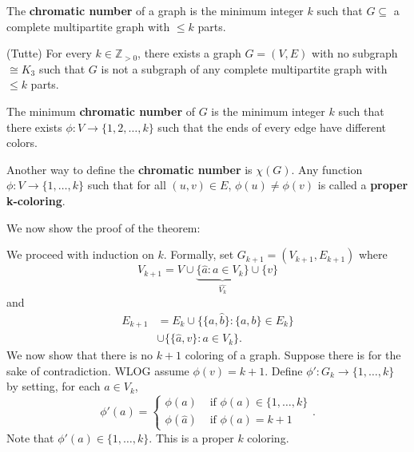 
\begin{definition}
	The \textbf{chromatic number} of a graph is the minimum integer \( k \) such that \( G \subseteq  \) a complete multipartite graph with \( \le k \) parts.
\end{definition}

\begin{theorem}
	(Tutte) For every \( k \in \mathbb{Z}_{>0} \), there exists a graph \( G=(V,E) \) with no subgraph \( \cong K_3 \) such that \( G \) is not a subgraph of any complete multipartite graph with \( \le k \) parts.
\end{theorem}

\begin{lemma}
	The minimum \textbf{chromatic number} of \( G \) is the minimum integer \( k \) such that there exists \( \phi : V \to \{1, 2, \ldots , k\}   \) such that the ends of every edge have different colors.
\end{lemma}

\begin{definition}
	Another way to define the \textbf{chromatic number} is \( \chi(G) \). Any function \(\phi :V \to \{1, \ldots , k\}   \) such that for all \( (u, v) \in E \), \( \phi (u) \neq  \phi (v) \) is called a \textbf{proper k-coloring}.
\end{definition}

We now show the proof of the theorem:
\begin{replacementproof}
	We proceed with induction on \( k \). Formally, set \( G_{k+1} = (V_{k+1}, E_{k+1}) \) where \[ V_{k+1} = V \cup \underbrace{\{\hat{a} : a \in V_k\}}_{\hat{V_k}}  \cup \{v\}    \] and
	\begin{align*}
		E_{k+1} &= E_k \cup \{\{a, \hat{b}\}: \{a, b\}  \in E_k   \}  \\ &\cup \{ \{\hat{a}, v\} : a \in V_k \}
	.\end{align*}
	We now show that there is no \( k+1 \) coloring of a graph. Suppose there is for the sake of contradiction. WLOG assume \( \phi (v) = k+1 \). Define \( \phi ' : G_k \to \{1, \ldots , k\}   \) by setting, for each \( a \in V_k \), \[
		\phi '(a) = \begin{cases}
			\phi (a) &\text{ if } \phi (a) \in \{1, \ldots , k\}  \\
			\phi (\hat{a}) &\text{ if } \phi (a) = k+1
		\end{cases}
	.\] Note that \( \phi '(a) \in \{1, \ldots , k\}   \). This is a proper \( k \) coloring. 
\end{replacementproof}

